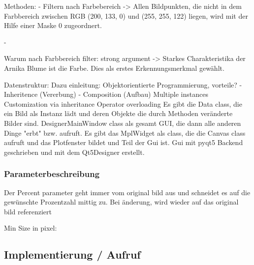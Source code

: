 Methoden: 
- Filtern nach Farbebereich ->
Allen Bildpunkten, die nicht in dem Farbbereich zwischen RGB (200, 133, 0) und (255, 255, 122) liegen, wird mit der Hilfe einer Maske 0 zugeordnert. 

- 

Warum nach Farbbereich filter:
strong argument -> Starkes Charakteristika der Arnika Blume ist die Farbe. Dies als erstes Erkennungsmerkmal gewählt.


Datenstruktur:
Dazu einleitung: Objektorientierte Programmierung, vorteile?
- Inheritence (Vererbung)
- Composition (Aufbau)
Multiple instances
Customization via inheritance
Operator overloading
Es gibt die Data class, die ein Bild als Instanz lädt und deren Objekte die durch Methoden veränderte Bilder sind. 
DesignerMainWindow class als gesamt GUI, die dann alle anderen Dinge "erbt" bzw. aufruft.
Es gibt das MplWidget als class, die die Canvas class aufruft und das Plotfenster bildet und Teil der Gui ist. 
Gui mit pyqt5 Backend geschrieben und mit dem Qt5Designer erstellt.



\subsubsection{Parameterbeschreibung}
Der Percent parameter geht immer vom original bild aus und schneidet es auf die gewünschte Prozentzahl mittig zu. Bei änderung, wird wieder auf das original bild referenziert

Min Size in pixel: 

\subsection{Implementierung / Aufruf}    




